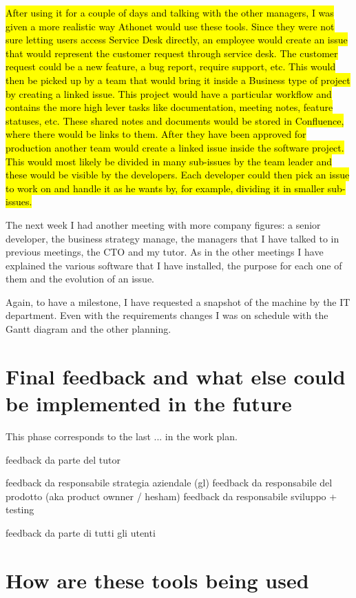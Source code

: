 	\hl{After using it for a couple of days and talking with the other managers, I was given a more realistic way Athonet would use these tools.
	Since they were not sure letting users access Service Desk directly, an employee would create an issue that would represent the customer request through service desk.
	The customer request could be a new feature, a bug report, require support, etc.
	This would then be picked up by a team that would bring it inside a Business type of project by creating a linked issue.
	This project would have a particular workflow and contains the more high lever tasks like documentation, meeting notes, feature statuses, etc.
	These shared notes and documents would be stored in Confluence, where there would be links to them.
	After they have been approved for production another team would create a linked issue inside the software project.
	This would most likely be divided in many sub-issues by the team leader and these would be visible by the developers.
	Each developer could then pick an issue to work on and handle it as he wants by, for example, dividing it in smaller sub-issues.}
	
	The next week I had another meeting with more company figures: a senior developer, the business strategy manage, the managers that I have talked to in previous meetings, the CTO and my tutor.
	As in the other meetings I have explained the various software that I have installed, the purpose for each one of them and the evolution of an issue.
	
	Again, to have a milestone, I have requested a snapshot of the machine by the IT department.
	Even with the requirements changes I was on schedule with the Gantt diagram and the other planning.

\section{Final feedback and what else could be implemented in the future}

	This phase corresponds to the last ... in the work plan.
	
	feedback da parte del tutor
	
	feedback da responsabile strategia aziendale (gl)
	feedback da responsabile del prodotto (aka product ownner / hesham)
	feedback da responsabile sviluppo + testing
	
	feedback da parte di tutti gli utenti

\section{How are these tools being used}

